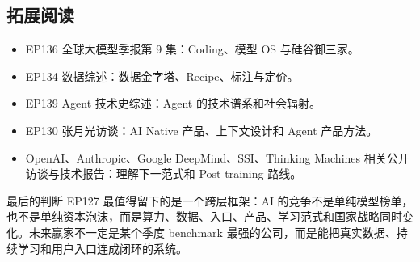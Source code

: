 \subsection{拓展阅读}

\begin{itemize}
\item EP136 全球大模型季报第 9 集：Coding、模型 OS 与硅谷御三家。
\item EP134 数据综述：数据金字塔、Recipe、标注与定价。
\item EP139 Agent 技术史综述：Agent 的技术谱系和社会辐射。
\item EP130 张月光访谈：AI Native 产品、上下文设计和 Agent 产品方法。
\item OpenAI、Anthropic、Google DeepMind、SSI、Thinking Machines 相关公开访谈与技术报告：理解下一范式和 Post-training 路线。
\end{itemize}

\begin{importantbox}{最后的判断}
EP127 最值得留下的是一个跨层框架：AI 的竞争不是单纯模型榜单，也不是单纯资本泡沫，而是算力、数据、入口、产品、学习范式和国家战略同时变化。未来赢家不一定是某个季度 benchmark 最强的公司，而是能把真实数据、持续学习和用户入口连成闭环的系统。
\end{importantbox}


